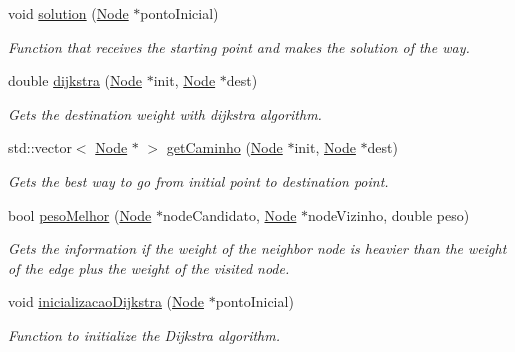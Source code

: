 \begin{DoxyCompactItemize}
\mbox{\label{class_map_af897299c8bdd483b81eca5d8d2c1248d}} 
void \mbox{\hyperlink{class_map_af897299c8bdd483b81eca5d8d2c1248d}{solution}} (\mbox{\hyperlink{class_node}{Node}} $\ast$ponto\+Inicial)
\begin{DoxyCompactList}\small\item\em Function that receives the starting point and makes the solution of the way. \end{DoxyCompactList}\item 
double \mbox{\hyperlink{class_map_a2469775f1933123c570f9a0dbf0b60a6}{dijkstra}} (\mbox{\hyperlink{class_node}{Node}} $\ast$init, \mbox{\hyperlink{class_node}{Node}} $\ast$dest)
\begin{DoxyCompactList}\small\item\em Gets the destination weight with dijkstra algorithm. \end{DoxyCompactList}\item 
std\+::vector$<$ \mbox{\hyperlink{class_node}{Node}} $\ast$ $>$ \mbox{\hyperlink{class_map_a3483fdf07f62ab1522be688ad25c8675}{get\+Caminho}} (\mbox{\hyperlink{class_node}{Node}} $\ast$init, \mbox{\hyperlink{class_node}{Node}} $\ast$dest)
\begin{DoxyCompactList}\small\item\em Gets the best way to go from initial point to destination point. \end{DoxyCompactList}\item 
bool \mbox{\hyperlink{class_map_a61ca34a3511bed7fc0d97dea319c1c38}{peso\+Melhor}} (\mbox{\hyperlink{class_node}{Node}} $\ast$node\+Candidato, \mbox{\hyperlink{class_node}{Node}} $\ast$node\+Vizinho, double peso)
\begin{DoxyCompactList}\small\item\em Gets the information if the weight of the neighbor node is heavier than the weight of the edge plus the weight of the visited node. \end{DoxyCompactList}\item 
\mbox{\label{class_map_a84ce82582d972df964371586761f9b04}} 
void \mbox{\hyperlink{class_map_a84ce82582d972df964371586761f9b04}{inicializacao\+Dijkstra}} (\mbox{\hyperlink{class_node}{Node}} $\ast$ponto\+Inicial)
\begin{DoxyCompactList}\small\item\em Function to initialize the Dijkstra algorithm. \end{DoxyCompactList}\item 

\end{DoxyCompactItemize}
